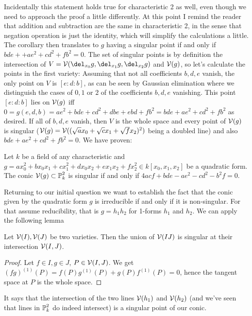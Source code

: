 Incidentally this statement holds true for characteristic 2 as well, even though we need to approach the proof a little differently.
At this point I remind the reader that addition and subtraction are the same in characteristic 2, in the sense that negation operation is just the identity, which will simplify the calculations a little.
The corollary then translates to $g$ having a singular point if and only if $bde + +ae^2 + cd^2 +fb^2 = 0$.
The set of singular points is by definition the intersection of $V = \V(\del_{x_0}g,\del_{x_1}g,\del_{x_2}g)$ and $\operatorname{\mathcal V}(g)$, so let's calculate the points in the first variety: Assuming that not all coefficients $b,d,e$ vanish, the only point on $V$ is $[e:d:b]$, as can be seen by Gaussian elimination where we distinguish the cases of $0,1$ or $2$ of the coefficients $b,d,e$ vanishing.
This point $[e:d:b]$ lies on $\operatorname{\mathcal V}(g)$ iff $0 = g(e,d,b) = ae^2 + bde + cd^2 + dbe + ebd + fb^2 = bde + ae^2 + cd^2 + fb^2$ as desired.
If all of $b,d,e$ vanish, then $V$ is the whole space and every point of $\operatorname{\mathcal V}(g)$ is singular ($\operatorname{\mathcal V}(g) = \operatorname{\mathcal V}((\sqrt{a}x_0 + \sqrt{c}x_1 + \sqrt{f}x_2)^2)$ being a doubled line) and also $bde + ae^2 + cd^2 + fb^2 = 0$. We have proven:

\begin{corollary} \label{corollarySingularConic}
Let $k$ be a field of any characteristic and $g = ax_0^2 + bx_0x_1 + cx_1^2 + dx_0x_2 + ex_1x_2 + fx_2^2
 \in k[x_0,x_1,x_2]$ be a quadratic form. The conic $\operatorname{\mathcal V}(g) \subset \operatorname{\mathbb P}^2_k$ is singular if and only if $4acf + bde - ae^2 - cd^2 - b^2f = 0$.
\end{corollary}


Returning to our initial question we want to establish the fact that the conic given by the quadratic form $g$ is irreducible if and only if it is non-singular.
For that assume reducibility, that is $g = h_1h_2$ for 1-forms $h_1$ and $h_2$.
We can apply the following lemma
\begin{lemma} \label{lemmaSingularIntersect}
Let $\operatorname{\mathcal V}(I),\operatorname{\mathcal V}(J)$ be two varieties. Then the union of $\operatorname{\mathcal V}(IJ)$ is singular at their intersection $\operatorname{\mathcal V}(I,J)$.
\end{lemma}
\begin{proof}
Let $f\in I, g\in J$, $P\in \operatorname{\mathcal V}(I,J)$. We get $(fg)^{(1)}(P) = f(P)g^{(1)}(P) + g(P)f^{(1)}(P) = 0$, hence the tangent space at $P$ is the whole space.
\end{proof}
It says that the intersection of the two lines $\operatorname{\mathcal V}(h_1)$ and $\operatorname{\mathcal V}(h_2)$ (and we've seen that lines in $\operatorname{\mathbb P}^2_k$ do indeed intersect) is a singular point of our conic.

